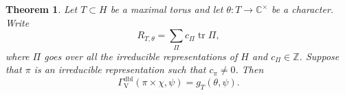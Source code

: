 \documentclass[12pt, reqno]{amsart}
\newtheorem{theorem}{Theorem}[section]
\theoremstyle{definition}
\theoremstyle{definition}
\theoremstyle{definition}
\newcommand{\zIntegers}{\mathbb{Z}}
\newcommand{\cComplex}{\mathbb{C}}
\newcommand{\multiplicativegroup}[1]{#1^{\times}}
\newcommand{\hermitianSpace}{\mathrm{V}}
\newcommand{\fieldCharacter}{\psi}
\newcommand{\trace}{\operatorname{tr}}
\newcommand{\quadraticExtension}{\mathbb{E}}
\newcommand{\dblGammaFactorSpace}[4]{\Gamma^{\mathrm{dbl}}_{#1}\left(#2 \times #3, #4\right)}
\newcommand{\LusztigSeries}[2]{\mathcal{E}\left(#1, (#2)\right)}
\newcommand{\calvin}[1]{\textcolor{orange}{\sffamily ((CALVIN: #1))}}
\begin{document}
\begin{theorem}\label{thm:doubling-method-gamma-factor-for-deligne-lusztig}
	Let $T \subset H$ be a maximal torus and let $\theta \colon T \to \multiplicativegroup{\cComplex}$ be a character. Write $$R_{T,\theta} = \sum_{\Pi} c_{\Pi} \trace \Pi,$$
	where $\Pi$ goes over all the irreducible representations of $H$ and $c_{\Pi} \in \zIntegers$. Suppose that $\pi$ is an irreducible representation such that $c_{\pi} \ne 0$. Then $$\dblGammaFactorSpace{\hermitianSpace}{\pi}{\chi}{\fieldCharacter} = g_T\left(\theta, \fieldCharacter\right).$$
\end{theorem}
\begin{comment}
\calvin{start alternate writeup of section 3.4/3.4.1:}
\subsection{Computation for Lusztig Series}
The goal of this section is to prove \Cref{thm:Phi_stable} in particular:
\begin{theorem}
\label{thm:doubling-method-gamma-factor-for-deligne-lusztig} If $c_{\pi}$ is nonzero in the virtual representation $R_T(\theta) = \sum c_{\pi} \pi$ then
$$\dblGammaFactorSpace{\hermitianSpace}{\pi}{\chi}{\fieldCharacter} = g_T\left(\theta, \fieldCharacter\right)$$
\end{theorem}
\calvin{add in $\chi$} the right hand side of which we showed in \Cref{lem:indep_geo_conj} only depends on the geometric conjugacy class of $(T,\theta)$ hence on the Lusztig series $\LusztigSeries{G}{s}$ which contains $\pi$.
\subsubsection{Proof of \Cref{thm:doubling-method-gamma-factor-for-deligne-lusztig}, \Cref{thm:Phi_stable}}
Our proof will be via induction on $\dim_{\quadraticExtension} \hermitianSpace$. First we will use \Cref{thm:multiplicativity-in-terms-of-gamma-factors}  and MULTIPLICAATIVITY-OF-GTTHETA to prove \Cref{thm:doubling-method-gamma-factor-for-deligne-lusztig} for any non cuspidal $\pi$ assuming \Cref{thm:doubling-method-gamma-factor-for-deligne-lusztig} for all Levi factors. \\

\begin{proof}
\calvin{should be short proof. Might not even need to put--just need to say both are multiplicative}
\end{proof}



\end{comment}
\end{document}
